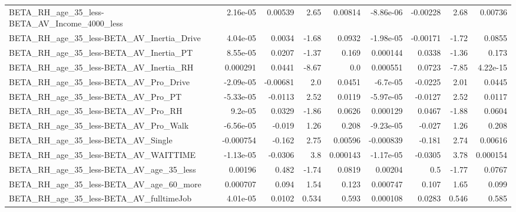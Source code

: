 \begin{tabular}{lrrrrrrrr}
BETA\_RH\_age\_35\_less-BETA\_AV\_Income\_4000\_less       &    2.16e-05 &      0.00539 &     2.65 &  0.00814 &  -8.86e-06 &    -0.00228 &         2.68 &       0.00736 \\
BETA\_RH\_age\_35\_less-BETA\_AV\_Inertia\_Drive          &    4.04e-05 &       0.0034 &    -1.68 &   0.0932 &  -1.98e-05 &    -0.00171 &        -1.72 &        0.0855 \\
BETA\_RH\_age\_35\_less-BETA\_AV\_Inertia\_PT             &    8.55e-05 &       0.0207 &    -1.37 &    0.169 &   0.000144 &      0.0338 &        -1.36 &         0.173 \\
BETA\_RH\_age\_35\_less-BETA\_AV\_Inertia\_RH             &    0.000291 &       0.0441 &    -8.67 &      0.0 &   0.000551 &      0.0723 &        -7.85 &      4.22e-15 \\
BETA\_RH\_age\_35\_less-BETA\_AV\_Pro\_Drive              &   -2.09e-05 &     -0.00681 &      2.0 &   0.0451 &   -6.7e-05 &     -0.0225 &         2.01 &        0.0445 \\
BETA\_RH\_age\_35\_less-BETA\_AV\_Pro\_PT                 &   -5.33e-05 &      -0.0113 &     2.52 &   0.0119 &  -5.97e-05 &     -0.0127 &         2.52 &        0.0117 \\
BETA\_RH\_age\_35\_less-BETA\_AV\_Pro\_RH                 &     9.2e-05 &       0.0329 &    -1.86 &   0.0626 &   0.000129 &      0.0467 &        -1.88 &        0.0604 \\
BETA\_RH\_age\_35\_less-BETA\_AV\_Pro\_Walk               &   -6.56e-05 &       -0.019 &     1.26 &    0.208 &  -9.23e-05 &      -0.027 &         1.26 &         0.208 \\
BETA\_RH\_age\_35\_less-BETA\_AV\_Single                 &   -0.000754 &       -0.162 &     2.75 &  0.00596 &  -0.000839 &      -0.181 &         2.74 &       0.00616 \\
BETA\_RH\_age\_35\_less-BETA\_AV\_WAITTIME               &   -1.13e-05 &      -0.0306 &      3.8 & 0.000143 &  -1.17e-05 &     -0.0305 &         3.78 &      0.000154 \\
BETA\_RH\_age\_35\_less-BETA\_AV\_age\_35\_less            &     0.00196 &        0.482 &    -1.74 &   0.0819 &    0.00204 &         0.5 &        -1.77 &        0.0767 \\
BETA\_RH\_age\_35\_less-BETA\_AV\_age\_60\_more            &    0.000707 &        0.094 &     1.54 &    0.123 &   0.000747 &       0.107 &         1.65 &         0.099 \\
BETA\_RH\_age\_35\_less-BETA\_AV\_fulltimeJob            &    4.01e-05 &       0.0102 &    0.534 &    0.593 &   0.000108 &      0.0283 &        0.546 &         0.585 \\

\end{tabular}
